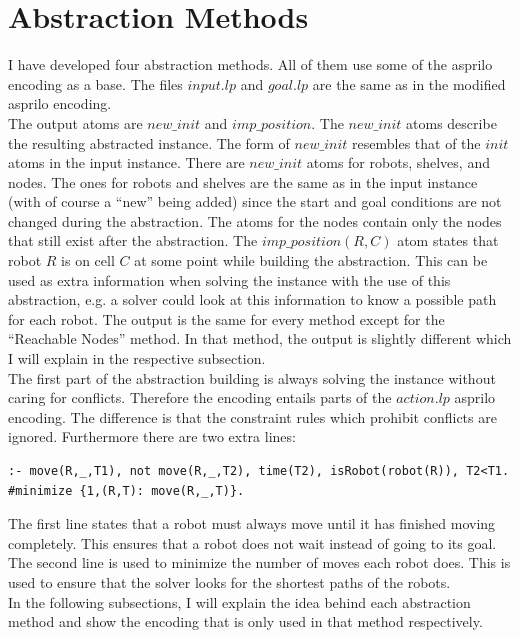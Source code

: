 \documentclass[runningheads]{llncs}
\begin{document}
\section{Abstraction Methods}
I have developed four abstraction methods. All of them use some of the asprilo encoding as a base. The files $input.lp$ and $goal.lp$ are the same as in the modified asprilo encoding. \\
The output atoms are $new\_init$ and $imp\_position$. The $new\_init$ atoms describe the resulting abstracted instance. The form of $new\_init$ resembles that of the $init$ atoms in the input instance. There are $new\_init$ atoms for robots, shelves, and nodes. The ones
for robots and shelves are the same as in the input instance (with of course a ``new'' being added) since the start and goal conditions are not changed during the abstraction. The atoms for the nodes contain only the nodes that still exist after the abstraction. The $imp\_position(R, C)$ atom states that robot $R$ is on cell $C$ at some point while building the abstraction. This can be used as extra information when solving the instance with the use of this abstraction, e.g. a solver could look at this information to know a possible path for each robot. The output is the same for every method except for the ``Reachable Nodes'' method. In that method, the output is slightly different which I will explain in the respective subsection. \\
The first part of the abstraction building is always solving the instance without caring for conflicts. Therefore the encoding entails parts of the $action.lp$ asprilo encoding. The difference is that the constraint rules which prohibit conflicts are ignored.
Furthermore there are two extra lines:
\begin{verbatim}
:- move(R,_,T1), not move(R,_,T2), time(T2), isRobot(robot(R)), T2<T1.
#minimize {1,(R,T): move(R,_,T)}.
\end{verbatim}
The first line states that a robot must always move until it has finished moving completely. This ensures that a robot does not wait instead of going to its goal. \\
The second line is used to minimize the number of moves each robot does. This is used to ensure that the solver looks for the shortest paths of the robots. \\
In the following subsections, I will explain the idea behind each abstraction method and show the encoding that is only used in that method respectively. 
\end{document}
